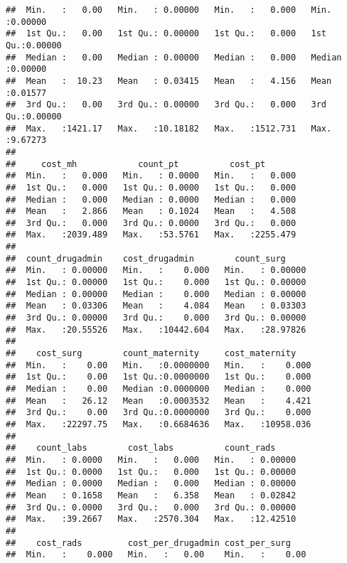 \documentclass[]{article}
\begin{document}
\begin{verbatim}
##  Min.   :   0.00   Min.   : 0.00000   Min.   :   0.000   Min.   :0.00000  
##  1st Qu.:   0.00   1st Qu.: 0.00000   1st Qu.:   0.000   1st Qu.:0.00000  
##  Median :   0.00   Median : 0.00000   Median :   0.000   Median :0.00000  
##  Mean   :  10.23   Mean   : 0.03415   Mean   :   4.156   Mean   :0.01577  
##  3rd Qu.:   0.00   3rd Qu.: 0.00000   3rd Qu.:   0.000   3rd Qu.:0.00000  
##  Max.   :1421.17   Max.   :10.18182   Max.   :1512.731   Max.   :9.67273  
##                                                                           
##     cost_mh            count_pt          cost_pt        
##  Min.   :   0.000   Min.   : 0.0000   Min.   :   0.000  
##  1st Qu.:   0.000   1st Qu.: 0.0000   1st Qu.:   0.000  
##  Median :   0.000   Median : 0.0000   Median :   0.000  
##  Mean   :   2.866   Mean   : 0.1024   Mean   :   4.508  
##  3rd Qu.:   0.000   3rd Qu.: 0.0000   3rd Qu.:   0.000  
##  Max.   :2039.489   Max.   :53.5761   Max.   :2255.479  
##                                                         
##  count_drugadmin    cost_drugadmin        count_surg      
##  Min.   : 0.00000   Min.   :    0.000   Min.   : 0.00000  
##  1st Qu.: 0.00000   1st Qu.:    0.000   1st Qu.: 0.00000  
##  Median : 0.00000   Median :    0.000   Median : 0.00000  
##  Mean   : 0.03306   Mean   :    4.084   Mean   : 0.03303  
##  3rd Qu.: 0.00000   3rd Qu.:    0.000   3rd Qu.: 0.00000  
##  Max.   :20.55526   Max.   :10442.604   Max.   :28.97826  
##                                                           
##    cost_surg        count_maternity     cost_maternity     
##  Min.   :    0.00   Min.   :0.0000000   Min.   :    0.000  
##  1st Qu.:    0.00   1st Qu.:0.0000000   1st Qu.:    0.000  
##  Median :    0.00   Median :0.0000000   Median :    0.000  
##  Mean   :   26.12   Mean   :0.0003532   Mean   :    4.421  
##  3rd Qu.:    0.00   3rd Qu.:0.0000000   3rd Qu.:    0.000  
##  Max.   :22297.75   Max.   :0.6684636   Max.   :10958.036  
##                                                            
##    count_labs        cost_labs          count_rads      
##  Min.   : 0.0000   Min.   :   0.000   Min.   : 0.00000  
##  1st Qu.: 0.0000   1st Qu.:   0.000   1st Qu.: 0.00000  
##  Median : 0.0000   Median :   0.000   Median : 0.00000  
##  Mean   : 0.1658   Mean   :   6.358   Mean   : 0.02842  
##  3rd Qu.: 0.0000   3rd Qu.:   0.000   3rd Qu.: 0.00000  
##  Max.   :39.2667   Max.   :2570.304   Max.   :12.42510  
##                                                         
##    cost_rads         cost_per_drugadmin cost_per_surg     
##  Min.   :    0.000   Min.   :   0.00    Min.   :    0.00  

\end{verbatim}
\end{document}
